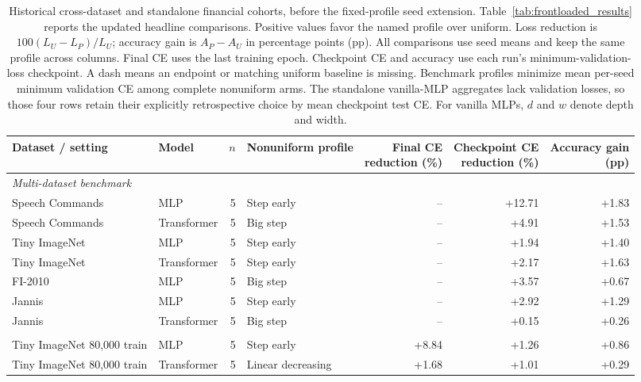 \begin{table}[t]
\centering
\caption{Historical cross-dataset and standalone financial cohorts, before the fixed-profile seed extension. Table~\ref{tab:frontloaded_results} reports the updated headline comparisons. Positive values favor the named profile over uniform. Loss reduction is $100(L_U-L_P)/L_U$; accuracy gain is $A_P-A_U$ in percentage points (pp). All comparisons use seed means and keep the same profile across columns. Final CE uses the last training epoch. Checkpoint CE and accuracy use each run's minimum-validation-loss checkpoint. A dash means an endpoint or matching uniform baseline is missing. Benchmark profiles minimize mean per-seed minimum validation CE among complete nonuniform arms. The standalone vanilla-MLP aggregates lack validation losses, so those four rows retain their explicitly retrospective choice by mean checkpoint test CE. For vanilla MLPs, $d$ and $w$ denote depth and width.}
\label{tab:benchmark_results}
\footnotesize
\setlength{\tabcolsep}{3pt}
\begin{tabular}{@{}llrlrrr@{}}
\toprule
Dataset / setting & Model & $n$ & Nonuniform profile & \shortstack{Final CE\\reduction (\%)} & \shortstack{Checkpoint CE\\reduction (\%)} & \shortstack{Accuracy gain\\(pp)} \\
\midrule
\multicolumn{7}{l}{\textit{Multi-dataset benchmark}} \\
Speech Commands & MLP & 5 & Step early & -- & +12.71 & +1.83 \\
Speech Commands & Transformer & 5 & Big step & -- & +4.91 & +1.53 \\
Tiny ImageNet & MLP & 5 & Step early & -- & +1.94 & +1.40 \\
Tiny ImageNet & Transformer & 5 & Step early & -- & +2.17 & +1.63 \\
FI-2010 & MLP & 5 & Big step & -- & +3.57 & +0.67 \\
Jannis & MLP & 5 & Step early & -- & +2.92 & +1.29 \\
Jannis & Transformer & 5 & Big step & -- & +0.15 & +0.26 \\
\addlinespace[3pt]
\multicolumn{7}{l}{\textit{Data-regime comparisons}} \\
Tiny ImageNet 80,000 train & MLP & 5 & Step early & +8.84 & +1.26 & +0.86 \\
Tiny ImageNet 80,000 train & Transformer & 5 & Linear decreasing & +1.68 & +1.01 & +0.29 \\

\end{tabular}
\end{table}
